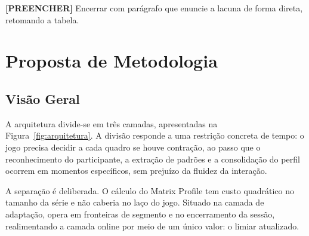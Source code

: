 
\textbf{[PREENCHER]} Encerrar com parágrafo que enuncie a lacuna de
forma direta, retomando a tabela.

\section{Proposta de Metodologia}

\subsection{Visão Geral}

A arquitetura divide-se em três camadas, apresentadas na
Figura~\ref{fig:arquitetura}. A divisão responde a uma restrição
concreta de tempo: o jogo precisa decidir a cada quadro se houve
contração, ao passo que o reconhecimento do participante, a extração de
padrões e a consolidação do perfil ocorrem em momentos específicos, sem
prejuízo da fluidez da interação.

A separação é deliberada. O cálculo do Matrix Profile tem custo
quadrático no tamanho da série e não caberia no laço do jogo. Situado
na camada de adaptação, opera em fronteiras de segmento e no
encerramento da sessão, realimentando a camada online por meio de um
único valor: o limiar atualizado.

